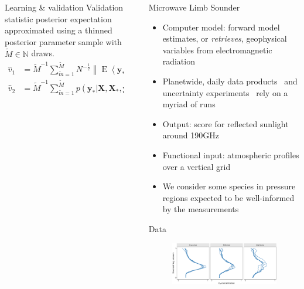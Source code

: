 \documentclass[final]{beamer}
\newlength{\sepwidth}
\newlength{\colwidth}
\newcommand{\separatorcolumn}{\begin{column}{\sepwidth}\end{column}}
\newcommand{\norm}[1]{\left\lVert#1\right\rVert}
\DeclareMathOperator{\evsym}{E}
\newcommand\EE[1]{\evsym\left\langle#1\right\rangle}
\begin{document}
\begin{frame}[t]
\begin{columns}[t]
\begin{column}{\colwidth}
\begin{block}{Learning \& validation}
      Validation statistic posterior expectation approximated using a thinned
      posterior parameter sample with $\tilde{M} \in \mathbb{N}$ draws.
      \begin{align}
        \hat{v}_1
        &= {\tilde{M}}^{-1} \sum_{{\tilde{m}}=1}^{{\tilde{M}}} N^{-\frac{1}{2}} \norm{%
          \EE{\bm{y}_{*} | \bm{X}, \bm{X}_{*}, \bm{y}, {\bm{\theta}}_{{\tilde{m}}}} -
          \bm{y}_{*}
          } \label{eq:validation-rmse} \\
        \hat{v}_2
        &= {\tilde{M}}^{-1} \sum_{{\tilde{m}}=1}^{{\tilde{M}}}
          p(\bm{y}_{*} | \bm{X}, \bm{X}_{*}, \bm{y},
          {\bm{\theta}}_{{\tilde{m}}}) \label{eq:validation-ppld}
      \end{align}
    \end{block}
  \end{column}

  \separatorcolumn{}

  \begin{column}{\colwidth}
    \begin{block}{Microwave Limb Sounder}

      \begin{itemize}
      \item Computer model: forward
        model~\cite{read2006,schwartz2006,waters2006} estimates, or
        \emph{retrieves}, geophysical variables from electromagnetic radiation
      \item Planetwide, daily data products~\cite{liversey2020} and uncertainty
        experiments~\cite{turmon2019,braverman2021} rely on a myriad of runs
      \item Output: score for reflected sunlight around 190GHz~\cite{johnson2020}
      \item Functional input: atmospheric profiles over a vertical grid
      \item We consider some species in pressure regions expected to be
        well-informed by the measurements~\cite{liversey2020}
      \end{itemize}

    \end{block}

    \begin{block}{Data}
      \begin{figure}
        \centering
        \includegraphics[width=\linewidth]{inc/mls_input_profiles}
      \end{figure}


\end{block}
\end{column}
\end{columns}
\end{frame}
\end{document}
